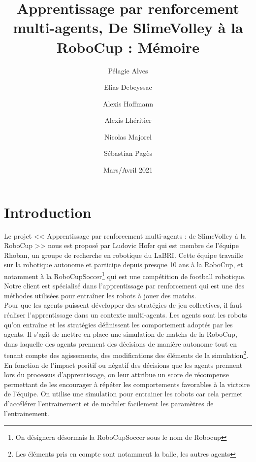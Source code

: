 \documentclass[11pt, a4paper]{article}
\title{Apprentissage par renforcement multi-agents, De SlimeVolley à la RoboCup : Mémoire}
\author{Pélagie Alves\and Elias Debeyssac\and Alexis Hoffmann\and
Alexis Lhéritier\and Nicolas Majorel\and Sébastian Pagès}
\date{Mars/Avril 2021}
\begin{document}
	\maketitle

	\newpage

	\tableofcontents

	\newpage

	\section{Introduction}

	Le projet << Apprentissage par renforcement multi-agents : de SlimeVolley à la RoboCup >> nous est proposé par Ludovic Hofer qui est membre de l’équipe Rhoban, un groupe de recherche en robotique du LaBRI. Cette équipe travaille sur la robotique autonome et participe depuis presque 10 ans à la RoboCup, et notamment à la RoboCupSoccer\footnote{ On désignera désormais la RoboCupSoccer sous le nom de Robocup } qui est une compétition de football robotique. Notre client est spécialisé dans l'apprentissage par renforcement qui est une des méthodes utilisées pour entraîner les robots à jouer des matchs.\\
	Pour que les agents puissent développer des stratégies de jeu collectives, il faut réaliser l'apprentissage dans un contexte multi-agents. Les agents sont les robots qu'on entraîne et les stratégies définissent les comportement adoptés par les agents. Il s'agit de mettre en place une simulation de matchs de la RoboCup, dans laquelle des agents prennent des décisions de manière autonome tout en tenant compte des agissements, des modifications des éléments de la simulation\footnote{Les éléments pris en compte sont notamment la balle, les autres agents}. En fonction de l'impact positif ou négatif des décisions que les agents prennent lors du processus d'apprentissage, on leur attribue un score de récompense permettant de les encourager à répéter les comportements favorables à la victoire de l'équipe. On utilise une simulation pour entrainer les robots car cela permet d'accélérer l'entrainement et de moduler facilement les paramètres de l'entrainement.
\end{document}
